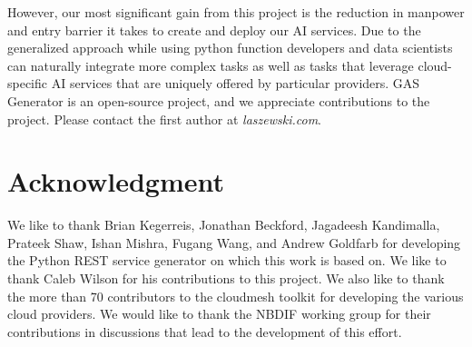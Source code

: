 However, our most significant gain from this project is the reduction in manpower and entry barrier it takes to create and deploy our AI services. Due to the generalized approach while using python function developers and data scientists can naturally integrate more complex tasks as well as tasks that leverage cloud-specific AI services that are uniquely offered by particular providers. GAS Generator is an open-source project, and we appreciate contributions to the project. Please contact the first author at  \textit{laszewski\@gmail.com}.


\section*{Acknowledgment}

We like to thank
Brian Kegerreis,
Jonathan Beckford,
Jagadeesh Kandimalla,
Prateek Shaw,
Ishan Mishra,
Fugang Wang, and Andrew Goldfarb for developing the Python REST service generator on which this work is based on. We like to thank Caleb Wilson for his contributions to this project. We also like to thank the more than 70 contributors to the cloudmesh toolkit for developing the various cloud providers. We would like to thank the NBDIF working group for their contributions in discussions that lead to the development of this effort.



